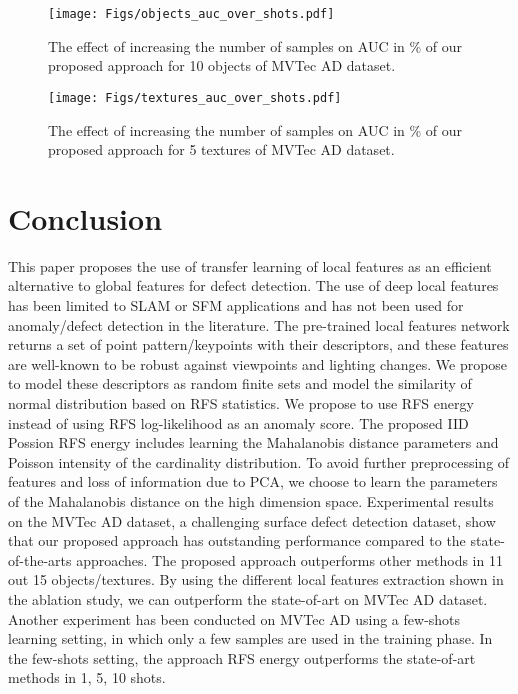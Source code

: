 \documentclass[journal]{IEEEtran}
\let\MYoriglatexcaption\caption
\renewcommand{\caption}[2][\relax]{\MYoriglatexcaption[#2]{#2}}
\begin{document}
\begin{figure}[!h]
	\texttt{[image: Figs/objects\_auc\_over\_shots.pdf]}
	\caption{The effect of increasing the number of samples on AUC in \% of our proposed approach for 10 objects of MVTec AD dataset.}
	\label{Fig:Mvtec_objects_overshots}
\end{figure} 

\begin{figure}[!h]
	\texttt{[image: Figs/textures\_auc\_over\_shots.pdf]}
	\caption{The effect of increasing the number of samples on AUC in \% of our proposed approach for 5 textures of MVTec AD dataset.}
	\label{Fig:Mvtec_textures_overshots}
\end{figure}

















\section{Conclusion}
\label{Sec:conclusion}
This paper proposes the use of transfer learning of local features as an efficient alternative to global features for defect detection. The use of deep local features has been limited to SLAM or SFM applications and has not been used for anomaly/defect detection in the literature. The pre-trained local features network returns a set of point pattern/keypoints with their descriptors, and these features are well-known to be robust against viewpoints and lighting changes. We propose to model these descriptors as random finite sets and model the similarity of normal distribution based on RFS statistics. We propose to use RFS energy instead of using RFS log-likelihood as an anomaly score. The proposed IID Possion RFS energy includes learning the Mahalanobis distance parameters and Poisson intensity of the cardinality distribution. To avoid further preprocessing of features and loss of information due to PCA, we choose to learn the parameters of the Mahalanobis distance on the high dimension space. Experimental results on the MVTec AD dataset, a challenging surface defect detection dataset, show that our proposed approach has outstanding performance compared to the state-of-the-arts approaches. The proposed approach outperforms other methods in 11 out 15 objects/textures. By using the different local features extraction shown in the ablation study, we can outperform the state-of-art on MVTec AD dataset. Another experiment has been conducted on MVTec AD using a few-shots learning setting, in which only a few samples are used in the training phase.  In the few-shots setting, the approach RFS energy outperforms the state-of-art methods in 1, 5, 10 shots.
\end{document}
